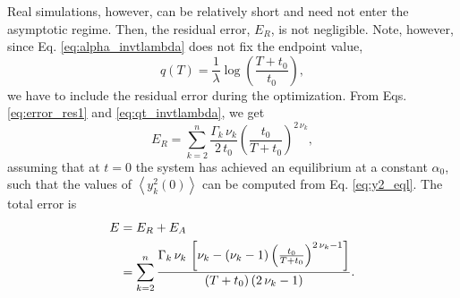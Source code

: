 \documentclass[reprint, floatfix]{revtex4-1}
\newcommand{\note}[1]{{\color{DarkGreen}\footnotesize \textsc{Note.} #1}}
\newcommand{\Err}{E}
\begin{document}
Real simulations, however,
can be relatively short
and need not enter
the asymptotic regime.
%
Then, the residual error, $\Err_R$, is not negligible.
%
Note, however,
since Eq. \eqref{eq:alpha_invtlambda}
does not fix the endpoint value,
%
\begin{equation}
q(T) = \frac{ 1 } { \lambda }
\log\left(
  \frac{ T + t_0 } { t_0 }
\right),
\label{eq:qt_invtlambda}
\end{equation}
%
we have to include the residual error
during the optimization.
%
From Eqs. \eqref{eq:error_res1} and \eqref{eq:qt_invtlambda},
we get
%
\begin{equation}
\Err_R
=
\sum_{k = 2}^n
  \frac{ \Gamma_k \, \nu_k }
       {        2 \, t_0   }
  \left(
      \frac{   t_0   }
           { T + t_0 }
   \right)^{ 2 \, \nu_k },
\label{eq:error_res_invt}
\end{equation}
%
assuming that at $t = 0$
the system has achieved an equilibrium
at a constant $\alpha_0$,
such that the values of
$\left\langle y_k^2(0) \right\rangle$
can be computed from Eq. \eqref{eq:y2_eql}.
%
The total error is
%
\begin{align}
\Err
&=
\Err_R + \Err_A
\notag
\\
&=
\sum_{ k = 2 }^n
  \frac
  {
    \Gamma_k \, \nu_k \,
    \left[
      \nu_k
      -
      (\nu_k - 1)
      \left(
        \frac{ t_0 } { T + t_0 }
      \right)^{ 2 \, \nu_k - 1 }
    \right]
  }
  {
    (T + t_0) \, (2 \, \nu_k - 1)
  }
  .
\label{eq:error_invt}
\end{align}
%

\end{document}
